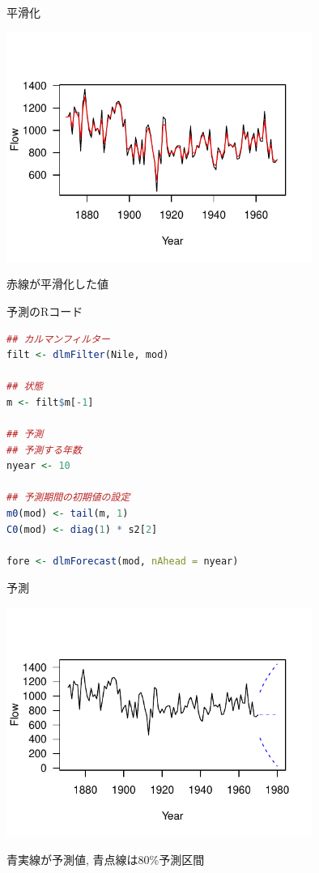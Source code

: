 \documentclass[dvipdfmx,12pt]{beamer}
\begin{document}
\begin{frame}{平滑化}
  \begin{center}
    \includegraphics[width=10cm]{dlm1_smooth}
  \end{center}

  赤線が平滑化した値
\end{frame}

\begin{frame}[fragile]{予測のRコード}
  \begin{lstlisting}[language=R]
## カルマンフィルター
filt <- dlmFilter(Nile, mod)

## 状態
m <- filt$m[-1]

## 予測
## 予測する年数
nyear <- 10

## 予測期間の初期値の設定
m0(mod) <- tail(m, 1)
C0(mod) <- diag(1) * s2[2]

fore <- dlmForecast(mod, nAhead = nyear)
  \end{lstlisting}
\end{frame}

\begin{frame}{予測}
  \begin{center}
    \includegraphics[width=10cm]{dlm1_predict}
  \end{center}

  青実線が予測値, 青点線は80\%予測区間
\end{frame}
\end{document}
